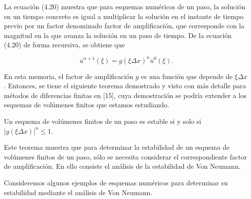 La ecuación (4.20) muestra que para esquemas numéricos de un paso, la
solución en un tiempo concreto es igual a multiplicar la solución en
el instante de tiempo previo por un factor denominado factor de
amplificación, que corresponde con la magnitud en la que avanza la
solución en un paso de tiempo.
De la ecuación (4.20) de forma recursiva, se obtiene que

\begin{equation*}
  \overline{u}^{n+1}
  \left(\xi\right)=
  {g\left(\xi\Delta x\right)}^{n}
  \overline{u}^{0}
  \left(\xi\right).
\end{equation*}

En esta memoria, el factor de amplificación $g$ es una función que
depende de $\xi\Delta x$.
Entonces, se tiene el siguiente teorema demostrado y visto con más
detalle para métodos de diferencias finitas en [15], cuya demostración
se podría extender a los esquemas de volúmenes finitos que estamos
estudiando.

\begin{theorem}
  Un esquema de volúmenes finitos de un paso es estable si y solo si
  \begin{math}
    {\left|
    {g\left(\xi\Delta x\right)}
    \right|}^{n}\leq
    1
  \end{math}.
\end{theorem}

Este teorema muestra que para determinar la estabilidad de un esquema
de volúmenes finitos de un paso, sólo se necesita considerar el
correspondiente factor de amplificación.
En ello consiste el análisis de la estabilidad de Von Neumann.

Consideremos algunos ejemplos de esquemas numéricos para determinar
su estabilidad mediante el análisis de Von Neumann.

